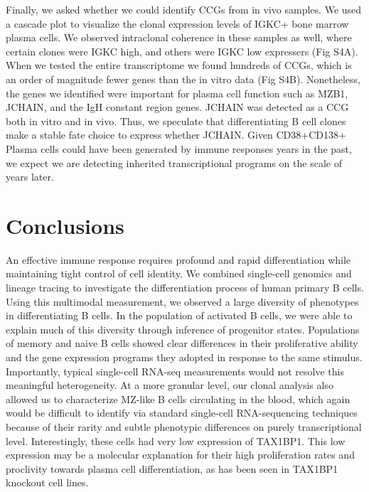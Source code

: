 Finally, we asked whether we could identify CCGs from in vivo samples. We used a cascade plot to visualize the clonal expression levels of IGKC+ bone marrow plasma cells. We observed intraclonal coherence in these samples as well, where certain clones were IGKC high, and others were IGKC low expressers (Fig S4A). When we tested the entire transcriptome we found hundreds of CCGs, which is an order of magnitude fewer genes than the in vitro data (Fig S4B). Nonetheless, the genes we identified were important for plasma cell function such as MZB1, JCHAIN, and the IgH constant region genes. JCHAIN was detected as a CCG both in vitro and in vivo. Thus, we speculate that differentiating B cell clones make a stable fate choice to express whether JCHAIN. Given CD38+CD138+ Plasma cells could have been generated by immune responses years in the past\cite{hammarlund_plasma_2017}, we expect we are detecting inherited transcriptional programs on the scale of years later.

\section{Conclusions}

An effective immune response requires profound and rapid differentiation while maintaining tight control of cell identity. We combined single-cell genomics and lineage tracing to investigate the differentiation process of human primary B cells. Using this multimodal measurement, we observed a large diversity of phenotypes in differentiating B cells. In the population of activated B cells, we were able to explain much of this diversity through inference of progenitor states. Populations of memory and naive B cells showed clear differences in their proliferative ability and the gene expression programs they adopted in response to the same stimulus. Importantly, typical single-cell RNA-seq measurements would not resolve this meaningful heterogeneity. At a more granular level, our clonal analysis also allowed us to characterize MZ-like B cells circulating in the blood, which again would be difficult to identify via standard single-cell RNA-sequencing techniques because of their rarity and subtle phenotypic differences on purely transcriptional level. Interestingly, these cells had very low expression of TAX1BP1. This low expression may be a molecular explanation for their high proliferation rates and proclivity towards plasma cell differentiation, as has been seen in TAX1BP1 knockout cell lines\cite{matsushita_regulation_2016}.

